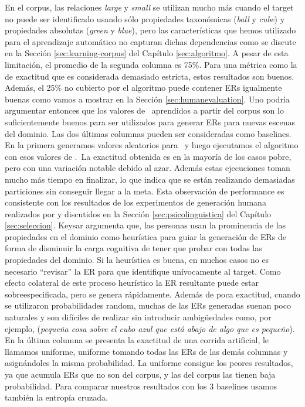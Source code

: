 En el corpus, las relaciones \emph{large} y \emph{small} se utilizan mucho m\'as cuando el target no puede ser identificado usando s\'olo propiedades taxon\'omicas (\emph{ball} y \emph{cube}) y propiedades absolutas (\emph{green} y \emph{blue}), pero las caracter\'{i}sticas que hemos utilizado para el aprendizaje autom\'atico no capturan dichas dependencias como se discute en la Secci\'on \ref{sec:learning-corpus} del Cap\'itulo \ref{sec:algoritmo}.
A pesar de esta limitaci\'on, el promedio de la segunda columna es 75\%. Para una m\'etrica como la de exactitud que es considerada demasiado estricta, estos resultados son buenos. Adem\'as, el 25\% no cubierto por el algoritmo puede contener ERs igualmente buenas como vamos a mostrar en la Secci\'on \ref{sec:humanevaluation}. Uno podr\'ia argumentar entonces que los valores de \puse\ aprendidos a partir del corpus son lo suficientemente buenos para ser utilizados para generar ERs para nuevas escenas del dominio.
Las dos \'ultimas columnas pueden ser consideradas como baselines. En la primera generamos
valores aleatorios para \puse\ y luego ejecutamos el algoritmo con esos valores de \puse.~La exactitud obtenida es en la mayor\'{i}a de los casos pobre, pero con
una variaci\'on notable debido al azar. Adem\'as estas ejecuciones toman mucho m\'as tiempo en finalizar, lo que indica que se est\'an realizando demasiadas particiones sin conseguir llegar a la meta. Esta observaci\'on de performance es consistente con los resultados de los experimentos de generaci\'on humana realizados por \cite{keysar:Curr98} y discutidos en la Secci\'on \ref{sec:psicolinguistica} del Cap\'itulo \ref{sec:seleccion}. Keysar argumenta que, las personas usan la prominencia de las propiedades en el dominio como heur\'istica para guiar la generaci\'on de ERs de forma de disminuir la carga cognitiva de tener que probar con todas las propiedades del dominio. Si la heur\'istica es buena, en muchos casos no es necesario ``revisar'' la ER para que identifique un\'ivocamente al target. Como efecto colateral de este proceso heur\'istico la ER resultante puede estar sobreespecificada, pero se genera r\'apidamente.  
Adem\'as de poca exactitud, cuando se utilizaron probabilidades random,  muchas de las ERs generadas suenan poco naturales y son dif\'iciles de realizar sin introducir ambig\"uedades como, por ejemplo, (\textit{peque\~na cosa sobre
el cubo azul que est\'a abajo de algo que es peque\~no}). En la \'ultima columna se presenta la exactitud de una corrida artificial, le llamamos uniforme, uniforme tomando todas las ERs de las dem\'as columnas y asign\'andoles la misma probabilidad. La uniforme consigue los peores resultados, ya que acumula ERs que no son del corpus, y las del corpus las tienen baja probabilidad. Para comparar nuestros resultados con los 3 baselines usamos tambi\'en la entrop\'ia cruzada.

